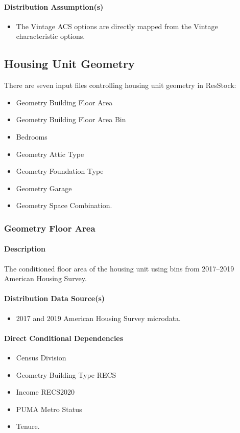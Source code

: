 \paragraph{Distribution Assumption(s)}
\begin{itemize}
    \item The Vintage ACS options are directly mapped from the Vintage characteristic options.
\end{itemize}

\subsection{Housing Unit Geometry}

There are seven input files controlling housing unit geometry in ResStock:

\begin{itemize}
    \item Geometry Building Floor Area
    \item Geometry Building Floor Area Bin
    \item Bedrooms
    \item Geometry Attic Type
    \item Geometry Foundation Type
    \item Geometry Garage
    \item Geometry Space Combination.
\end{itemize}



\subsubsection{Geometry Floor Area}
\paragraph{Description}
The conditioned floor area of the housing unit using bins from 2017--2019 American Housing Survey.

\paragraph{Distribution Data Source(s)}
\begin{itemize}
    \item 2017 and 2019 American Housing Survey microdata.
\end{itemize}

\paragraph{Direct Conditional Dependencies}
\begin{itemize}
    \item Census Division
    \item Geometry Building Type RECS
    \item Income RECS2020
    \item PUMA Metro Status
    \item Tenure.
\end{itemize}


